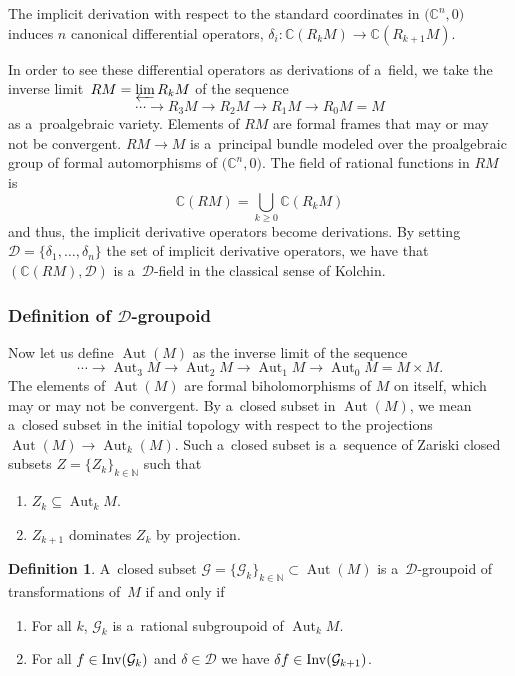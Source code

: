 \documentclass[pdftex]{sigma}
\numberwithin{equation}{section}
\theoremstyle{definition}
\newtheorem{Definition}[Theorem]{Definition}
\begin{document}
The implicit derivation with respect to the standard coordinates in $\bigl(\mathbb C^n,0\bigr)$ induces $n$ canonical differential operators,
$\delta_i \colon \mathbb C(R_kM) \to \mathbb C(R_{k+1}M)$.

In order to see these differential operators as derivations of a~field, we take the inverse limit~${RM = \varprojlim R_kM}$ of the sequence
\[\cdots \to R_3M \to R_2M \to R_1M \to R_0M=M\]
as a~proalgebraic variety. Elements of $RM$ are formal frames that may or may not be convergent. $RM\to M$ is a~principal bundle modeled over the proalgebraic group
 of formal automorphisms of $\bigl(\mathbb C^n,0\bigr)$. The field of rational functions in $RM$ is
\[\mathbb C(RM) = \bigcup_{k\geq 0} \mathbb C(R_kM)\]
and thus, the implicit derivative operators become derivations. By setting $\mathcal D = \{\delta_1,\dots,\delta_n\}$ the set of implicit derivative operators, we have that $(\mathbb C(RM), \mathcal D)$ is a~$\mathcal D$-field in the classical sense of Kolchin.

\subsubsection[Definition of D-groupoid]{Definition of $\boldsymbol{\mathcal D}$-groupoid}

Now let us define $\operatorname{Aut}(M)$ as the inverse limit of the sequence
\[
\cdots \to \operatorname{Aut}_3M \to \operatorname{Aut}_2M \to \operatorname{Aut}_1M \to \operatorname{Aut}_0M = M\times M.
\]
The elements of $\operatorname{Aut}(M)$ are formal biholomorphisms of $M$ on itself, which may or may not be convergent. By a~closed subset in $\operatorname{Aut}(M)$, we mean a~closed subset in the initial topology with respect to the projections $\operatorname{Aut}(M)\to\operatorname{Aut}_k(M)$. Such a~closed subset is a~sequence of Zariski closed subsets $Z = \{Z_k\}_{k\in \mathbb N}$ such that
\begin{enumerate}\itemsep=0pt
 \item[(a)] $Z_k\subseteq \operatorname{Aut}_kM$.
 \item[(b)] $Z_{k+1}$ dominates $Z_k$ by projection.
\end{enumerate}

\begin{Definition}\label{def_Dgroupoid} A~closed subset $\mathcal G = \{\mathcal G_k\}_{k\in \mathbb N} \subset \operatorname{Aut}(M)$ is a~$\mathcal D$-groupoid of transformations of~$M$ if and only if
\begin{enumerate}\itemsep=0pt
 \item[(a)] For all $k$, $\mathcal G_k$ is a~rational subgroupoid of $\operatorname{Aut}_kM$.
 \item[(b)] For all $f\in {\rm Inv}(\mathcal G_k)$ and $\delta \in \mathcal D$ we have $\delta f \in {\rm Inv}(\mathcal G_{k+1})$.
\end{enumerate}
\end{Definition}
\end{document}
